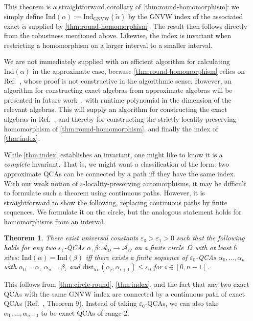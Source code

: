 \documentclass[11pt,reqno]{amsart}
\newtheorem{theorem}{Theorem}[section]
\theoremstyle{definition}
\theoremstyle{remark}
\numberwithin{equation}{section}
\newcommand{\eps}{\varepsilon}
\newcommand{\cA}{\mathcal A}
\begin{document}
\noindent
This theorem is a straightforward corollary of \cref{thm:round-homomorphism}:
we simply define  $\mathrm{Ind}(\alpha):= \mathrm{Ind}_{\mathrm{GNVW}}(\tilde \alpha)$ by the GNVW index of the associated exact $\tilde \alpha$ supplied by \cref{thm:round-homomorphism}.
The result then follows directly from the robustness mentioned above.
Likewise, the index is invariant when restricting a homomorphism on a larger interval to a smaller interval.

We are not immediately supplied with an efficient algorithm for calculating $\mathrm{Ind}(\alpha)$ in the approximate case, because \cref{thm:round-homomorphism} relies on Ref.~\cite{kitaev2024almost},
whose proof is not constructive in the algorithmic sense.
However, an algorithm for constructing exact algebras from approximate algebras will be presented in future work~\cite{ranard26forthcoming}, with runtime polynomial in the dimension of the relevant algebras.
This will supply an algorithm for constructing the exact algebras in Ref.~\cite{kitaev2024almost}, and thereby for constructing the strictly locality-preserving homomorphism of \cref{thm:round-homomorphism}, and finally the index of \cref{thm:index}.


While \cref{thm:index} establishes an invariant, one might like to know it is a \textit{complete} invariant.
That is, we might want a classification of the form: two approximate QCAs can be connected by a path iff they have the same index.
With our weak notion of $\eps$-locality-preserving automorphisms, it may be difficult to formulate such a theorem using continuous paths.
However, it is straightforward to show the following, replacing continuous paths by finite sequences.
We formulate it on the circle, but the analogous statement holds for homomorphisms from an interval.
\begin{theorem}\label{thm:discrete path}
    There exist universal constants $\eps_0 > \eps_1 > 0$ such that the following holds for any two $\eps_1$-QCAs $\alpha, \beta : \cA_\Omega \to \cA_\Omega$ on a finite circle~$\Omega$ with at least $6$ sites:
    $\mathrm{Ind}(\alpha)=\mathrm{Ind}(\beta)$ iff there exists a finite sequence of $\eps_0$-QCAs $\alpha_0, \ldots, \alpha_n$ with $\alpha_0=\alpha$, $\alpha_n=\beta$, and $\mathrm{dist}_\mathrm{loc}(\alpha_i,\alpha_{i+1}) \leq \eps_0$ for $i \in [0,n-1]$.
\end{theorem}

\noindent
This follows from \cref{thm:circle-round}, \cref{thm:index}, and the fact that any two exact QCAs with the same GNVW index are connected by a continuous path of exact QCAs (Ref.~\cite{gross2012index}, Theorem 9).
Instead of taking $\eps_0$-QCAs, we can also take $\alpha_1,\dots,\alpha_{n-1}$ to be exact QCAs of range $2$.
\end{document}

